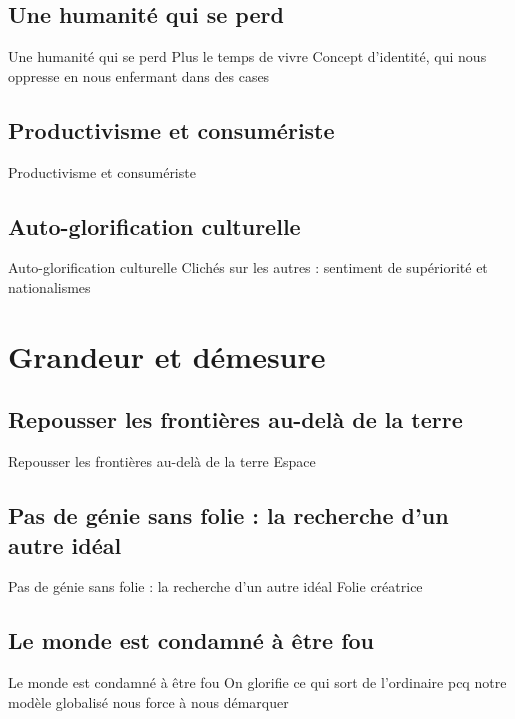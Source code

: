 \documentclass{beamer}
\begin{document}
\subsection{Une humanité qui se perd}
\begin{frame}{Une humanité qui se perd}
  Plus le temps de vivre
  Concept d'identité, qui nous oppresse en nous enfermant dans des cases
\end{frame}

\subsection{Productivisme et consumériste}
\begin{frame}{Productivisme et consumériste}

\end{frame}

\subsection{Auto-glorification culturelle}
\begin{frame}{Auto-glorification culturelle}
  Clichés sur les autres : sentiment de supériorité et nationalismes
\end{frame}


\section{Grandeur et démesure}

\subsection{Repousser les frontières au-delà de la terre}
\begin{frame}{Repousser les frontières au-delà de la terre}
  Espace
\end{frame}

\subsection{Pas de génie sans folie : la recherche d'un autre idéal}
\begin{frame}{Pas de génie sans folie : la recherche d'un autre idéal}
  Folie créatrice
\end{frame}

\subsection{Le monde est condamné à être fou}
\begin{frame}{Le monde est condamné à être fou}
  On glorifie ce qui sort de l'ordinaire pcq notre modèle globalisé nous force à nous démarquer
\end{frame}
\end{document}
